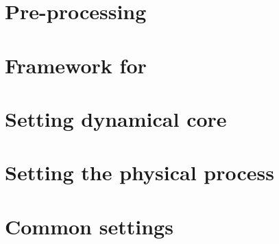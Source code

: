 \documentclass[a4paper]{report}
\begin{document}
\chapter{Pre-processing}
%  
 
%  

 \chapter{Framework for \scaledg}
%  
%  
 
%  
 
%  
%  
%  
%  
%  
%  


% 

\chapter{Setting dynamical core}


 \chapter{Setting the physical process} \label{sec:basic_usel_physics}
%  
%  
%  
%  
%  
%  
%  
%  
%  

 \chapter{Common settings}
%  
%  
%  
\end{document}
